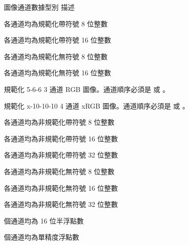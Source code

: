\bTABLE[option=stretch]

\bTABLEhead
\bTR[background=color,backgroundcolor=gray]
  \bTH 圖像通道數據型別 \eTH
  \bTH 描述 \eTH
\eTR
\eTABLEhead

\bTABLEbody

\bTR
  \bTD {} \eTD
  \bTD 各通道均為規範化帶符號 8 位整數 \eTD
\eTR

\bTR
  \bTD {} \eTD
  \bTD 各通道均為規範化帶符號 16 位整數 \eTD
\eTR

\bTR
  \bTD {} \eTD
  \bTD 各通道均為規範化無符號 8 位整數 \eTD
\eTR

\bTR
  \bTD {} \eTD
  \bTD 各通道均為規範化無符號 16 位整數 \eTD
\eTR

\bTR
  \bTD {} \eTD
  \bTD 規範化 5-6-6 3 通道 RGB 圖像。通道順序必須是  或 。 \eTD
\eTR

\bTR
  \bTD {} \eTD
  \bTD 規範化 x-10-10-10 4 通道 xRGB 圖像。通道順序必須是  或 。 \eTD
\eTR

\bTR
  \bTD {} \eTD
  \bTD 各通道均為非規範化帶符號 8 位整數 \eTD
\eTR

\bTR
  \bTD {} \eTD
  \bTD 各通道均為非規範化帶符號 16 位整數 \eTD
\eTR

\bTR
  \bTD {} \eTD
  \bTD 各通道均為非規範化帶符號 32 位整數 \eTD
\eTR

\bTR
  \bTD {} \eTD
  \bTD 各通道均為非規範化無符號 8 位整數 \eTD
\eTR

\bTR
  \bTD {} \eTD
  \bTD 各通道均為非規範化無符號 16 位整數 \eTD
\eTR

\bTR
  \bTD {} \eTD
  \bTD 各通道均為非規範化無符號 32 位整數 \eTD
\eTR

\bTR
  \bTD {} \eTD
  \bTD 個通道均為 16 位半浮點數 \eTD
\eTR

\bTR
  \bTD {} \eTD
  \bTD 個通道均為單精度浮點數 \eTD
\eTR

\eTABLEbody

\eTABLE


